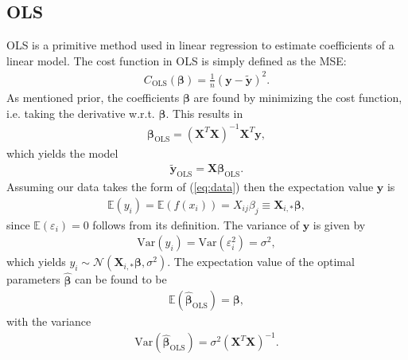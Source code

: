 \documentclass[%
reprint,
amsmath,amssymb,
aps,
pra,
]{revtex4-2}
\newcommand{\f}[2]{\frac{#1}{#2}}
\begin{document}
\subsection{OLS}	
\label{sec:THEORY_OLS}
OLS is a primitive method used in linear regression to estimate coefficients of a linear model. The cost function in OLS is simply defined as the MSE:
\begin{align}
	C_\text{OLS}(\bm\beta)=\f1n(\bm y-\tilde{\bm y})^2.
	\label{eq:cost_ols}
\end{align}
As mentioned prior, the coefficients $\bm\beta$ are found by minimizing the cost function, i.e. taking the derivative w.r.t. $\bm\beta$. This results in
\begin{align}
	\bm\beta_\text{OLS}=(\bm X^T\bm X)^{-1}\bm X^T\bm y,
	\label{eq:beta_ols}
\end{align}
which yields the model
\begin{align}
	\tilde{\bm y}_\text{OLS}=\bm X\bm \beta_\text{OLS}.
\end{align}
Assuming our data takes the form of (\ref{eq:data}) then the expectation value $\bm y$ is
\begin{align*}
	\mathbb{E}(y_i)=\mathbb{E}(f(x_i))=X_{ij}\beta_j\equiv\bm X_{i,*}\bm\beta,
\end{align*}
since $\mathbb{E}(\varepsilon_i)=0$ follows from its definition. The variance of $\bm y$ is given by
\begin{align*}
	\text{Var}(y_i)=\text{Var}(\varepsilon_i^2)=\sigma^2,
\end{align*}
which yields $y_i\sim\mathcal{N}(\bm X_{i,*}\bm\beta,\sigma^2)$. The expectation value of the optimal parameters $\hat{\bm\beta}$ can be found to be
\begin{align*}
	\mathbb{E}(\hat{\bm\beta}_\text{OLS})=\bm\beta,
\end{align*}
with the variance
\begin{align*}
	\text{Var}(\hat{\bm\beta}_\text{OLS})=\sigma^2(\bm X^T \bm X)^{-1}.
\end{align*}
\end{document}

